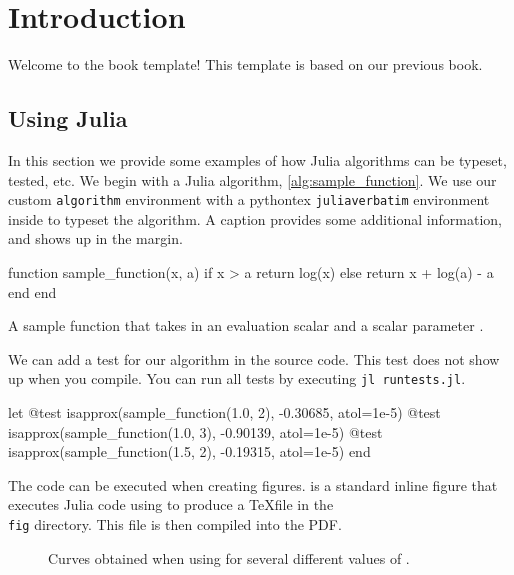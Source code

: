 \chapter{Introduction}
\label{ch:introduction}

Welcome to the book template!
This template is based on our previous book.\cite{Kochenderfer2019}

\section{Using Julia}

In this section we provide some examples of how Julia algorithms can be typeset, tested, etc.
We begin with a Julia algorithm, \cref{alg:sample_function}.
We use our custom \texttt{algorithm} environment with a pythontex \texttt{juliaverbatim} environment inside to typeset the algorithm.
A caption provides some additional information, and shows up in the margin.

\begin{algorithm}
\begin{juliaverbatim}
function sample_function(x, a)
	if x > a
		return log(x)
	else
		return x + log(a) - a
	end
end
\end{juliaverbatim}
\caption{
	\label{alg:sample_function}
	A sample function that takes in an evaluation scalar  and a scalar parameter .
}
\end{algorithm}

We can add a test for our algorithm in the source code.
This test does not show up when you compile.
You can run all tests by executing \texttt{jl runtests.jl}.

\begin{juliatest}
let
	@test isapprox(sample_function(1.0, 2), -0.30685, atol=1e-5)
	@test isapprox(sample_function(1.0, 3), -0.90139, atol=1e-5)
	@test isapprox(sample_function(1.5, 2), -0.19315, atol=1e-5)
end
\end{juliatest}

The code can be executed when creating figures.
 is a standard inline figure that executes Julia code using  to produce a \TeX file in the \texttt{\\fig} directory.
This file is then compiled into the PDF.

\begin{figure}
	\begin{center}
	\end{center}
	\caption{
		\label{fig:sample_function}
		Curves obtained when using  for several different values of .
	}
\end{figure}

